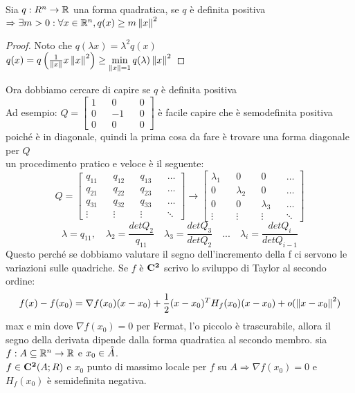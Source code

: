 \proposition
Sia $q:R^n\rightarrow \mathbb{R}$ una forma quadratica, se $q$ è definita positiva $\Rightarrow \exists m>0: \forall x \in \mathbb{R}^n, q(x)\ge m\left\|x\right\|^2$
\begin{proof}
	Noto che $q(\lambda x)=\lambda^2q(x)$\\
	$q(x)=q\left(\frac{1}{\left\|x\right\|}x\left\|x\right\|^2\right)\ge\min\limits_{\left\|x\right\|=1}q(\lambda)\left\|x\right\|^2$
\end{proof}
Ora dobbiamo cercare di capire se $q$ è definita positiva\\
Ad esempio: $Q=\begin{bmatrix}1&&0&&0\\0&&-1&&0\\0&&0&&0\end{bmatrix}$ è facile capire che è semodefinita positiva poiché è in diagonale, quindi la prima cosa da fare è trovare una forma diagonale per $Q$\\
un procedimento pratico e veloce è il seguente:\\
$$Q=\begin{bmatrix}q_{11}&&q_{12}&&q_{13}&&\ldots\\q_{21}&&q_{22}&&q_{23}&&\ldots\\q_{31}&&q_{32}&&q_{33}&&\ldots\\\vdots&&\vdots&&\vdots&&\ddots\end{bmatrix}\rightarrow\begin{bmatrix}\lambda_{1}&&0&&0&&\ldots\\0&&\lambda_{2}&&0&&\ldots\\0&&0&&\lambda_{3}&&\ldots\\\vdots&&\vdots&&\vdots&&\ddots\end{bmatrix}$$
$$\lambda=q_{11},\quad\lambda_{2}=\frac{detQ_2}{q_11}\quad\lambda_{3}=\frac{detQ_3}{detQ_2}\quad ...\quad \lambda_{i}=\frac{detQ_i}{detQ_{i-1}}$$
Questo perché se dobbiamo valutare il segno dell'incremento della f ci servono le variazioni sulle quadriche. Se $f$ è $\mathbf{C^{2}}$ scrivo lo sviluppo di Taylor al secondo ordine:\\
$$f(x)-f(x_0)=\nabla f(x_0)(x-x_0)+\frac{1}{2}(x-x_0)^TH_f(x_0)(x-x_0)+o(\left\|x-x_0\right\|^2)$$
max e min dove $\nabla f(x_0)=0$ per Fermat, l'o piccolo è trascurabile, allora il segno della derivata dipende dalla forma quadratica al secondo membro.
\proposition
sia $f:A\subseteq \mathbb{R}^n\rightarrow \mathbb{R}$ e $x_0\in\accentset{\circ}{A}$.\\
$f\in \mathbf{C^{2}}(A;R)$ e $x_0$ punto di massimo locale per $f$ su $A\Rightarrow\nabla f(x_0)=0$ e $H_f(x_0)$ è semidefinita negativa.
